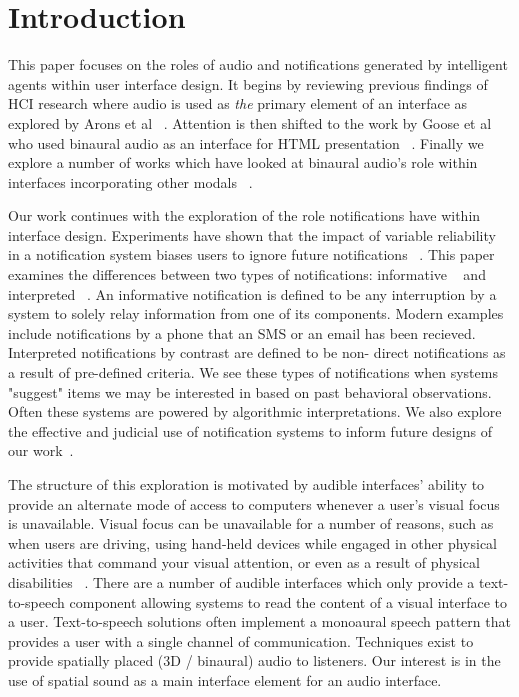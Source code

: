 \newpage                                                 \chapter{Introduction}
\renewcommand{\thepage }{\arabic{page}}                    \setcounter{page}{1}

This paper focuses on the roles of audio and notifications generated by
intelligent agents within user interface design. It begins by reviewing previous
findings of HCI research where audio is used as \textit{the} primary element
of an interface as explored by Arons et al ~\cite{arons1991hyperspeech}. 
Attention is then shifted to the work by Goose et al who used binaural audio as
an interface for HTML presentation ~\cite{goose19993dAudio}. Finally we explore
a number of works which have looked at binaural audio's role within interfaces 
incorporating other modals ~\cite{ yu2006novel, marentakis2004study}.

Our work continues with the exploration of the role notifications have within
interface design. Experiments have shown that the impact of variable reliability
in a notification system biases users to ignore future notifications
~\cite{leetiernan2001effective}. This paper examines the  differences between
two types of notifications: informative ~\cite{maltz2000cue} and interpreted
~\cite{horvitz1999principles}. An informative notification is defined to be any 
interruption by a system to solely relay information from one of its components. 
Modern examples include notifications by a phone that an SMS or an email has 
been recieved. Interpreted notifications by contrast are defined to be non-
direct notifications as a result of pre-defined criteria. We see these types of
notifications when systems "suggest" items we may be interested in based on past
behavioral observations. Often these systems are powered by algorithmic 
interpretations. We also explore the effective and judicial use of notification 
systems to inform future designs of our work~\cite{cutrell2001notification}.

The structure of this exploration is motivated by audible interfaces' ability to
provide an alternate mode of access to computers whenever a user's visual focus
is unavailable. Visual focus can be unavailable for a number of reasons, such as
when users are driving, using hand-held devices while engaged in other physical
activities that command your visual attention, or even as a result of physical
disabilities ~\cite{michelis2008disappearing}. There are a number of audible
interfaces which only provide a text-to-speech component allowing systems
to read the content of a visual interface to a user.  Text-to-speech solutions
often implement a monoaural speech pattern that provides a user with a single
channel of communication. Techniques exist to provide spatially placed (3D /
binaural) audio to listeners.  Our interest is in the use of spatial sound as
a main interface element for an audio interface.

